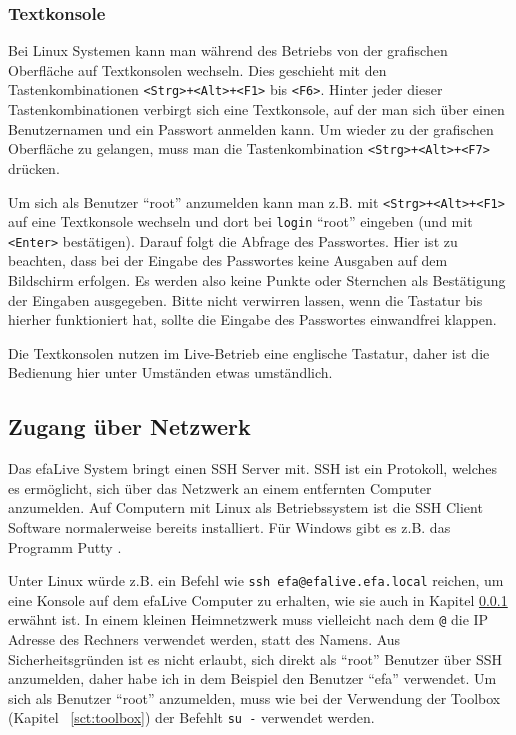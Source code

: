 \documentclass[a4paper,12pt,twoside]{article}
\begin{document}
\subsubsection{Textkonsole}
\label{sct:textkonsole}
Bei Linux Systemen kann man während
des Betriebs von der grafischen Oberfläche auf Textkonsolen wechseln.
Dies geschieht mit den Tastenkombinationen
\texttt{{\textless}Strg{\textgreater}+{\textless}Alt{\textgreater}+{\textless}F1{\textgreater}}
bis \texttt{{\textless}F6{\textgreater}}. Hinter jeder dieser
Tastenkombinationen verbirgt sich eine Textkonsole, auf der man sich
über einen Benutzernamen und ein Passwort anmelden kann. Um wieder zu
der grafischen Oberfläche zu gelangen, muss man die Tastenkombination
\texttt{{\textless}Strg{\textgreater}+{\textless}Alt{\textgreater}+{\textless}F7{\textgreater}}
drücken.

Um sich als Benutzer "`root"' anzumelden kann
man z.B. mit
\texttt{{\textless}Strg{\textgreater}+{\textless}Alt{\textgreater}+{\textless}F1{\textgreater}}
auf eine Textkonsole wechseln und dort bei
\texttt{login} "`root"'
eingeben (und mit \texttt{{\textless}Enter{\textgreater}} bestätigen). Darauf
folgt die Abfrage des Passwortes. Hier ist zu beachten, dass bei der
Eingabe des Passwortes keine Ausgaben auf dem Bildschirm erfolgen. Es
werden also keine Punkte oder Sternchen als Bestätigung der Eingaben
ausgegeben. Bitte nicht verwirren lassen, wenn die Tastatur bis hierher
funktioniert hat, sollte die Eingabe des Passwortes einwandfrei
klappen.

Die Textkonsolen nutzen im Live-Betrieb eine englische Tastatur, daher
ist die Bedienung hier unter Umständen etwas umständlich.


\subsection{Zugang über Netzwerk}
\label{sct:zugang_netzwerk}
Das efaLive System bringt einen SSH Server mit. SSH ist ein Protokoll,
welches es ermöglicht, sich über das Netzwerk an einem entfernten
Computer anzumelden. Auf Computern mit Linux als Betriebssystem ist die
SSH Client Software normalerweise bereits installiert. Für Windows gibt
es z.B. das Programm Putty \cite{PUT1}.

Unter Linux würde z.B. ein Befehl wie \texttt{ssh efa@efalive.efa.local} 
reichen, um eine Konsole auf dem
efaLive Computer zu erhalten, wie sie auch in Kapitel
\ref{sct:textkonsole} erwähnt ist. In einem kleinen Heimnetzwerk
muss vielleicht nach dem \texttt{@} die IP Adresse
des Rechners verwendet werden, statt des Namens. Aus Sicherheitsgründen
ist es nicht erlaubt, sich direkt als
"`root"' Benutzer über SSH anzumelden, daher
habe ich in dem Beispiel den Benutzer "`efa"'
verwendet. Um sich als Benutzer "`root"'
anzumelden, muss wie bei der Verwendung der Toolbox (Kapitel
~\ref{sct:toolbox}) der Befehlt \texttt{su -} verwendet werden.
\end{document}
